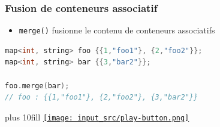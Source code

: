 \documentclass[C++.tex]{subfiles}
\begin{document}
\begin{frame}[fragile]
	\frametitle{Fusion de conteneurs associatif}
	\begin{itemize}
		\item \lstinline|merge()| fusionne le contenu de conteneurs associatifs
	\end{itemize}

	\begin{lstlisting}[language=C++]
map<int, string> foo {{1,"foo1"}, {2,"foo2"}};
map<int, string> bar {{3,"bar2"}};

foo.merge(bar);
// foo : {{1,"foo1"}, {2,"foo2"}, {3,"bar2"}}\end{lstlisting}

	\vskip 10mm plus 10fill
	\hfill
	\href{https://godbolt.org/#g:!((g:!((g:!((h:codeEditor,i:(filename:'1',fontScale:14,fontUsePx:'0',j:1,lang:c%2B%2B,selection:(endColumn:1,endLineNumber:17,positionColumn:1,positionLineNumber:17,selectionStartColumn:1,selectionStartLineNumber:17,startColumn:1,startLineNumber:17),source:'%23include+%3Ciostream%3E%0A%23include+%3Cmap%3E%0A%23include+%3Cstring%3E%0A%0Aint+main()%0A%7B%0A++std::map%3Cint,+std::string%3E+foo+%7B%7B1,%22foo1%22%7D,+%7B2,%22foo2%22%7D%7D%3B%0A++std::map%3Cint,+std::string%3E+bar+%7B%7B3,%22bar2%22%7D%7D%3B%0A%0A++foo.merge(bar)%3B%0A++for(const+auto%26+%5Bk,v%5D+:+foo)%0A++%7B%0A++++std::cout+%3C%3C+k+%3C%3C+!'-!'+%3C%3C+v+%3C%3C+!'+!'%3B%0A++%7D%0A++std::cout+%3C%3C+!'%5Cn!'%3B%0A++std::cout+%3C%3C+!'%5Cn!'%3B%0A%7D%0A'),l:'5',n:'0',o:'C%2B%2B+source+%231',t:'0')),k:50,l:'4',n:'0',o:'',s:0,t:'0'),(g:!((h:executor,i:(argsPanelShown:'1',compilationPanelShown:'0',compiler:g112,compilerOutShown:'0',execArgs:'',execStdin:'',fontScale:14,fontUsePx:'0',j:1,lang:c%2B%2B,libs:!((name:boost,ver:'175')),options:'-std%3Dc%2B%2B17',source:1,stdinPanelShown:'1',tree:'1',wrap:'0'),l:'5',n:'0',o:'Executor+x86-64+gcc+11.2+(C%2B%2B,+Editor+%231)',t:'0')),header:(),k:50,l:'4',n:'0',o:'',s:0,t:'0')),l:'2',n:'0',o:'',t:'0')),version:4}{\texttt{[image: input\_src/play-button.png]}}
\end{frame}
\end{document}
